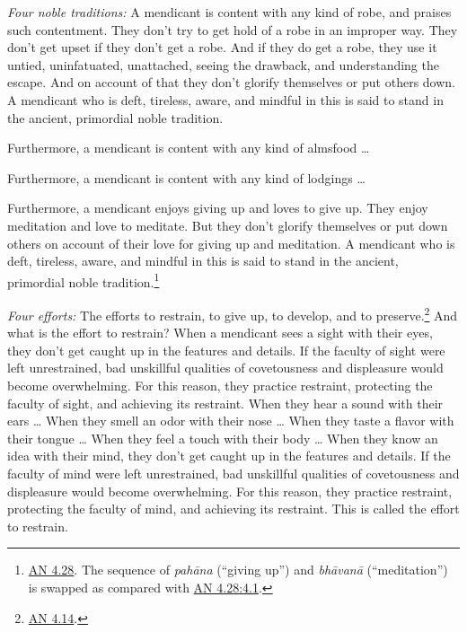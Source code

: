 \documentclass[12pt,openany]{book}%
\begin{document}
\emph{Four noble traditions:} A mendicant is content with any kind of robe, and praises such contentment. They don’t try to get hold of a robe in an improper way. They don’t get upset if they don’t get a robe. And if they do get a robe, they use it untied, uninfatuated, unattached, seeing the drawback, and understanding the escape. And on account of that they don’t glorify themselves or put others down. A mendicant who is deft, tireless, aware, and mindful in this is said to stand in the ancient, primordial noble tradition. 

Furthermore, a mendicant is content with any kind of almsfood … 

Furthermore, a mendicant is content with any kind of lodgings … 

Furthermore, a mendicant enjoys giving up and loves to give up. They enjoy meditation and love to meditate. But they don’t glorify themselves or put down others on account of their love for giving up and meditation. A mendicant who is deft, tireless, aware, and mindful in this is said to stand in the ancient, primordial noble tradition.\footnote{\href{https://suttacentral.net/an4.28/en/sujato}{AN 4.28}.  The sequence of \textit{\textsanskrit{pahāna}} (“giving up”) and \textit{\textsanskrit{bhāvanā}} (“meditation”) is swapped as compared with \href{https://suttacentral.net/an4.28/en/sujato\#4.1}{AN 4.28:4.1}. } 

\emph{Four efforts:} The efforts to restrain, to give up, to develop, and to preserve.\footnote{\href{https://suttacentral.net/an4.14/en/sujato}{AN 4.14}. } And what is the effort to restrain? When a mendicant sees a sight with their eyes, they don’t get caught up in the features and details. If the faculty of sight were left unrestrained, bad unskillful qualities of covetousness and displeasure would become overwhelming. For this reason, they practice restraint, protecting the faculty of sight, and achieving its restraint. When they hear a sound with their ears … When they smell an odor with their nose … When they taste a flavor with their tongue … When they feel a touch with their body … When they know an idea with their mind, they don’t get caught up in the features and details. If the faculty of mind were left unrestrained, bad unskillful qualities of covetousness and displeasure would become overwhelming. For this reason, they practice restraint, protecting the faculty of mind, and achieving its restraint. This is called the effort to restrain. 
\end{document}
